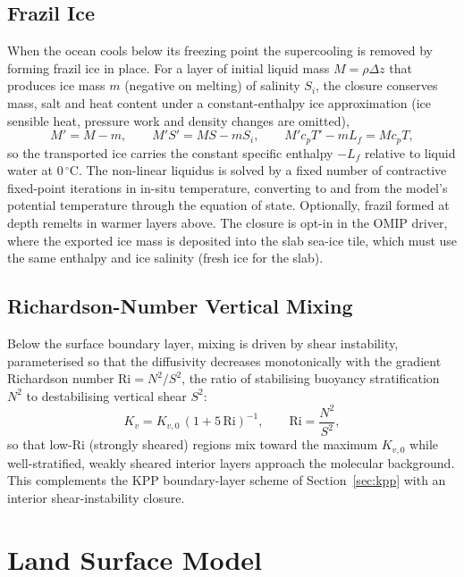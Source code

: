 \documentclass[11pt,twoside]{report}
\newcommand{\Lf}{L_f}
\begin{document}
\section{Frazil Ice}
\label{sec:frazil}

When the ocean cools below its freezing point the supercooling is removed by
forming frazil ice in place.  For a layer of initial liquid mass $M=\rho\Delta
z$ that produces ice mass $m$ (negative on melting) of salinity $S_i$, the
closure conserves mass, salt and heat content under a constant-enthalpy ice
approximation (ice sensible heat, pressure work and density changes are
omitted),
\begin{equation}
  M'=M-m,\qquad M'S'=MS-mS_i,\qquad M'c_pT'-m\Lf=Mc_pT,
\end{equation}
so the transported ice carries the constant specific enthalpy $-\Lf$
relative to liquid water at 0\,$^\circ$C.  The non-linear liquidus is solved
by a fixed number of contractive fixed-point iterations in in-situ
temperature, converting to and from the model's potential temperature through
the equation of state.  Optionally, frazil formed at depth remelts in warmer
layers above.  The closure is opt-in in the OMIP driver, where the
exported ice mass is deposited into the slab sea-ice tile, which must use the
same enthalpy and ice salinity (fresh ice for the slab).

\section{Richardson-Number Vertical Mixing}

Below the surface boundary layer, mixing is driven by shear instability,
parameterised so that the diffusivity decreases monotonically with the
gradient Richardson number $\mathrm{Ri}=N^2/S^2$, the ratio of stabilising
buoyancy stratification $N^2$ to destabilising vertical shear $S^2$:
\begin{equation}
  K_v = K_{v,0}\,(1 + 5\,\mathrm{Ri})^{-1},
  \qquad \mathrm{Ri} = \frac{N^2}{S^2},
\end{equation}
so that low-$\mathrm{Ri}$ (strongly sheared) regions mix toward the maximum
$K_{v,0}$ while well-stratified, weakly sheared interior layers approach
the molecular background.  This complements the KPP boundary-layer scheme
of Section~\ref{sec:kpp} with an interior shear-instability closure.


\chapter{Land Surface Model}
\label{ch:land}
\end{document}
